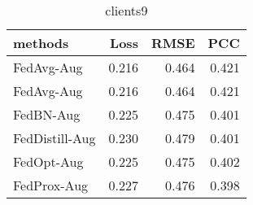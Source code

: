 \begin{table}
\caption{clients9}
\begin{tabular}{lrrr}
\toprule
methods & Loss & RMSE & PCC \\
\midrule
FedAvg-Aug & 0.216 & 0.464 & 0.421 \\
FedAvg-Aug & 0.216 & 0.464 & 0.421 \\
FedBN-Aug & 0.225 & 0.475 & 0.401 \\
FedDistill-Aug & 0.230 & 0.479 & 0.401 \\
FedOpt-Aug & 0.225 & 0.475 & 0.402 \\
FedProx-Aug & 0.227 & 0.476 & 0.398 \\
\bottomrule
\end{tabular}
\end{table}
